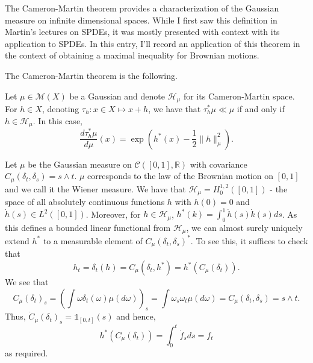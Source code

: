 \documentclass{article}
\begin{document}
The Cameron-Martin theorem provides a characterization of the Gaussian measure on infinite dimensional
spaces. While I first saw this definition in Martin's lectures on SPDEs, it was mostly presented
with context with its application to SPDEs. In this entry, I'll record an application of this
theorem in the context of obtaining a maximal inequality for Brownian motions.

The Cameron-Martin theorem is the following.

\begin{theorem}
Let \(\mu \in \mathcal{M}(X)\) be a Gaussian and denote \(\mathcal{H}_\mu\) for its Cameron-Martin space.
For \(h \in X\), denoting \(\tau_h : x \in X \mapsto x + h\), we have that \(\tau_h^* \mu \ll \mu\) if and only
if \(h \in \mathcal{H}_\mu\). In this case,
\[\frac{d\tau_h^* \mu}{d\mu}(x) = \exp\left(h^*(x) - \frac{1}{2}\|h\|^2_\mu\right).\]
\end{theorem}

Let \(\mu\) be the Gaussian measure on \(\mathcal{C}([0, 1], \mathbb{R})\) with covariance
\(C_\mu(\delta_t, \delta_s) = s \wedge t\). \(\mu\) corresponds to the law of the Brownian motion
on \([0, 1]\) and we call it the Wiener measure. We have that \(\mathcal{H}_\mu = H^{1, 2}_0([0, 1])\) -
the space of all absolutely continuous functions \(h\) with \(h(0) = 0\) and \(\dot h(s) \in L^2([0, 1])\).
Moreover, for \(h \in \mathcal{H}_\mu\),
\(h^*(k) = \int_0^1 \dot h(s) \dot k(s) d s\). As this defines a bounded linear functional from \(\mathcal{H}_\mu\),
we can almost surely uniquely extend \(h^*\) to a measurable element of \(C_\mu(\delta_t, \delta_s)^*\).
To see this, it suffices to check that
\[h_t = \delta_t(h) = C_\mu(\delta_t, h^*) = h^*(C_\mu(\delta_t)).\]
We see that
\[C_\mu(\delta_t)_s = \left(\int \omega \delta_t(\omega) \mu(d \omega)\right)_s
= \int \omega_s \omega_t \mu(d \omega) = C_\mu(\delta_t, \delta_s) = s \wedge t.\]
Thus, \(\dot{C}_\mu(\delta_t)_s = \mathbb{1}_{[0, t]}(s)\) and hence,
\[h^*(C_\mu(\delta_t)) = \int_0^t \dot f_s d s = f_t\]
as required.
\end{document}
